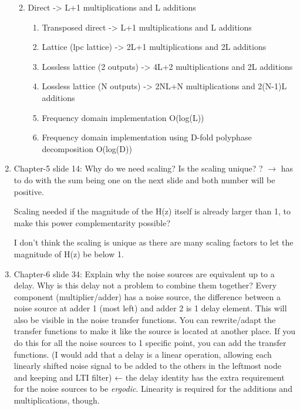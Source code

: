 \documentclass[
  a4paper,
  ,captions=tableheading
]{scrartcl}
\providecommand{\tightlist}{%
  \setlength{\itemsep}{0pt}\setlength{\parskip}{0pt}}
\begin{document}
\begin{enumerate}
  \begin{enumerate}
  \def\labelenumii{\arabic{enumii}.}
  \tightlist
  \item
    Direct -\textgreater{} L+1 multiplications and L additions

    \begin{enumerate}
    \def\labelenumiii{\arabic{enumiii}.}
    \setcounter{enumiii}{1}
    \tightlist
    \item
      Transposed direct -\textgreater{} L+1 multiplications and L
      additions\\
    \item
      Lattice (lpc lattice) -\textgreater{} 2L+1 multiplications and 2L
      additions\\
    \item
      Lossless lattice (2 outputs) -\textgreater{} 4L+2 multiplications
      and 2L additions\\
    \item
      Lossless lattice (N outputs) -\textgreater{} 2NL+N multiplications
      and 2(N-1)L additions\\
    \item
      Frequency domain implementation O(log(L))\\
    \item
      Frequency domain implementation using D-fold polyphase
      decomposition O(log(D))\\
    \end{enumerate}
  \end{enumerate}
\item
  Chapter-5 slide 14: Why do we need scaling? Is the scaling unique? ?
  \(\rightarrow\) has to do with the sum being one on the next slide and
  both number will be positive.

  Scaling needed if the magnitude of the H(z) itself is already larger
  than 1, to make this power complementarity possible?

  I don't think the scaling is unique as there are many scaling factors
  to let the magnitude of H(z) be below 1.
\item
  Chapter-6 slide 34: Explain why the noise sources are equivalent up to
  a delay. Why is this delay not a problem to combine them together?
  Every component (multiplier/adder) has a noise source, the difference
  between a noise source at adder 1 (most left) and adder 2 is 1 delay
  element. This will also be visible in the noise transfer functions.
  You can rewrite/adapt the transfer functions to make it like the
  source is located at another place. If you do this for all the noise
  sources to 1 specific point, you can add the transfer functions. (I
  would add that a delay is a linear operation, allowing each linearly
  shifted noise signal to be added to the others in the leftmost node
  and keeping and LTI filter) ← the delay identity has the extra
  requirement for the noise sources to be \emph{ergodic}. Linearity is
  required for the additions and multiplications, though.


\end{enumerate}
\end{document}
